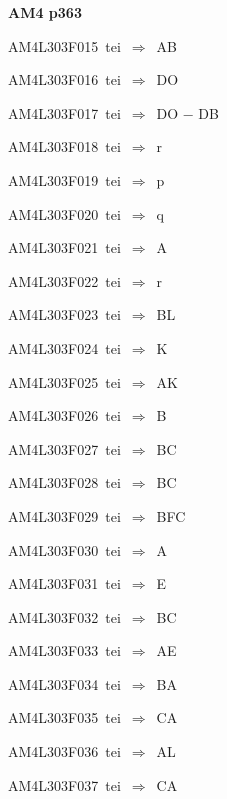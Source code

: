 \par\vfill\eject
{\bf\hfill AM4 p363\hfill\hbox{}}\par\bigskip
{\sixrm AM4L303F015\ {\sixit tei}\ }$\Rightarrow$\ AB\par\smallskip
{\sixrm AM4L303F016\ {\sixit tei}\ }$\Rightarrow$\ DO\par\smallskip
{\sixrm AM4L303F017\ {\sixit tei}\ }$\Rightarrow$\ DO − DB\par\smallskip
{\sixrm AM4L303F018\ {\sixit tei}\ }$\Rightarrow$\ {\tenit r}\par\smallskip
{\sixrm AM4L303F019\ {\sixit tei}\ }$\Rightarrow$\ {\tenit p}\par\smallskip
{\sixrm AM4L303F020\ {\sixit tei}\ }$\Rightarrow$\ {\tenit q}\par\smallskip
{\sixrm AM4L303F021\ {\sixit tei}\ }$\Rightarrow$\ A\par\smallskip
{\sixrm AM4L303F022\ {\sixit tei}\ }$\Rightarrow$\ {\tenit r}\par\smallskip
{\sixrm AM4L303F023\ {\sixit tei}\ }$\Rightarrow$\ BL\par\smallskip
{\sixrm AM4L303F024\ {\sixit tei}\ }$\Rightarrow$\ K\par\smallskip
{\sixrm AM4L303F025\ {\sixit tei}\ }$\Rightarrow$\ AK\par\smallskip
{\sixrm AM4L303F026\ {\sixit tei}\ }$\Rightarrow$\ B\par\smallskip
{\sixrm AM4L303F027\ {\sixit tei}\ }$\Rightarrow$\ BC\par\smallskip
{\sixrm AM4L303F028\ {\sixit tei}\ }$\Rightarrow$\ BC\par\smallskip
{\sixrm AM4L303F029\ {\sixit tei}\ }$\Rightarrow$\ BFC\par\smallskip
{\sixrm AM4L303F030\ {\sixit tei}\ }$\Rightarrow$\ A\par\smallskip
{\sixrm AM4L303F031\ {\sixit tei}\ }$\Rightarrow$\ E\par\smallskip
{\sixrm AM4L303F032\ {\sixit tei}\ }$\Rightarrow$\ BC\par\smallskip
{\sixrm AM4L303F033\ {\sixit tei}\ }$\Rightarrow$\ AE\par\smallskip
{\sixrm AM4L303F034\ {\sixit tei}\ }$\Rightarrow$\ BA\par\smallskip
{\sixrm AM4L303F035\ {\sixit tei}\ }$\Rightarrow$\ CA\par\smallskip
{\sixrm AM4L303F036\ {\sixit tei}\ }$\Rightarrow$\ AL\par\smallskip
{\sixrm AM4L303F037\ {\sixit tei}\ }$\Rightarrow$\ CA\par\smallskip

